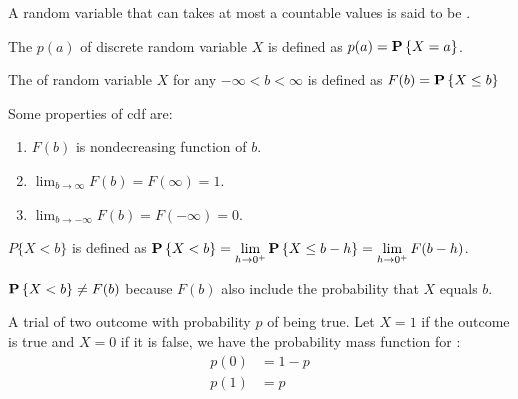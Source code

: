 \begin{definition}
    A random variable that can takes at most a countable values is said to be .
\end{definition}

\begin{definition}
    The  $p(a)$ of discrete random variable $X$ is defined as $p(a) = \mathop{\bf P\/}\left\{X = a\right\}$.
\end{definition}


\begin{definition}[cdf]
    The  of random variable $X$ for any $- \infty < b < \infty$ is defined as $F(b) = \mathop{\bf P\/}\left\{ X \leq b \right\}$
\end{definition}

\begin{theorem}
    Some properties of cdf are:
    \begin{enumerate}
        \item $F(b)$ is nondecreasing function of $b$.
        \item $\displaystyle \lim_{b \rightarrow \infty} F(b) = F(\infty) = 1$.
        \item $\displaystyle \lim_{b \rightarrow -\infty} F(b) = F(- \infty) = 0$.
    \end{enumerate}
\end{theorem}

\begin{definition}
    $P\{ X < b \}$ is defined as $\mathop{\bf P\/}\left\{ X < b \right\} = \displaystyle \lim_{h \rightarrow 0^+} \mathop{\bf P\/}\left\{ X \leq b - h \right\} = \lim_{h \rightarrow 0^+} F(b-h)$.
\end{definition}

$\mathop{\bf P\/}\left\{X < b\right\} \neq F(b)$ because $F(b)$ also include the probability that $X$ equals $b$.

\begin{definition}
    A trial of two outcome with probability $p$ of being true. Let $X=1$ if the outcome is true and $X=0$ if it is false, we have the probability mass function for :
    \begin{equation}
        \begin{aligned}
            p(0) &= 1 - p \\
            p (1) &= p
        \end{aligned}
    \end{equation}
\end{definition}

